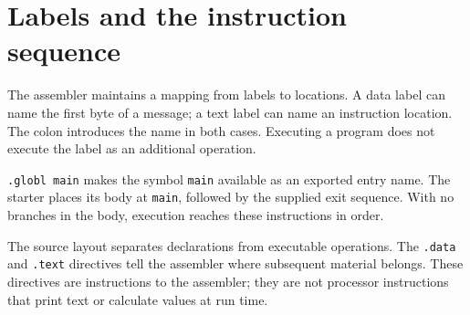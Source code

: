\section{Labels and the instruction
  sequence}\label{001-console-calculation-p03-labels-and-the-instruction-sequence}

The assembler maintains a mapping from labels to locations. A data label
can name the first byte of a message; a text label can name an
instruction location. The colon introduces the name in both cases.
Executing a program does not execute the label as an additional
operation.

\texttt{.globl\ main} makes the symbol \texttt{main} available as an
exported entry name. The starter places its body at \texttt{main},
followed by the supplied exit sequence. With no branches in the body,
execution reaches these instructions in order.

The source layout separates declarations from executable operations. The
\texttt{.data} and \texttt{.text} directives tell the assembler where
subsequent material belongs. These directives are instructions to the
assembler; they are not processor instructions that print text or
calculate values at run time.
